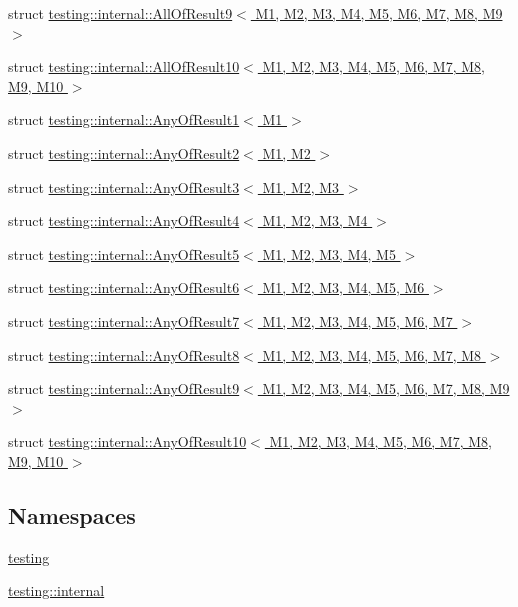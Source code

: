 \begin{DoxyCompactItemize}
\item 
struct \hyperlink{structtesting_1_1internal_1_1_all_of_result9}{testing\+::internal\+::\+All\+Of\+Result9$<$ M1, M2, M3, M4, M5, M6, M7, M8, M9 $>$}
\item 
struct \hyperlink{structtesting_1_1internal_1_1_all_of_result10}{testing\+::internal\+::\+All\+Of\+Result10$<$ M1, M2, M3, M4, M5, M6, M7, M8, M9, M10 $>$}
\item 
struct \hyperlink{structtesting_1_1internal_1_1_any_of_result1}{testing\+::internal\+::\+Any\+Of\+Result1$<$ M1 $>$}
\item 
struct \hyperlink{structtesting_1_1internal_1_1_any_of_result2}{testing\+::internal\+::\+Any\+Of\+Result2$<$ M1, M2 $>$}
\item 
struct \hyperlink{structtesting_1_1internal_1_1_any_of_result3}{testing\+::internal\+::\+Any\+Of\+Result3$<$ M1, M2, M3 $>$}
\item 
struct \hyperlink{structtesting_1_1internal_1_1_any_of_result4}{testing\+::internal\+::\+Any\+Of\+Result4$<$ M1, M2, M3, M4 $>$}
\item 
struct \hyperlink{structtesting_1_1internal_1_1_any_of_result5}{testing\+::internal\+::\+Any\+Of\+Result5$<$ M1, M2, M3, M4, M5 $>$}
\item 
struct \hyperlink{structtesting_1_1internal_1_1_any_of_result6}{testing\+::internal\+::\+Any\+Of\+Result6$<$ M1, M2, M3, M4, M5, M6 $>$}
\item 
struct \hyperlink{structtesting_1_1internal_1_1_any_of_result7}{testing\+::internal\+::\+Any\+Of\+Result7$<$ M1, M2, M3, M4, M5, M6, M7 $>$}
\item 
struct \hyperlink{structtesting_1_1internal_1_1_any_of_result8}{testing\+::internal\+::\+Any\+Of\+Result8$<$ M1, M2, M3, M4, M5, M6, M7, M8 $>$}
\item 
struct \hyperlink{structtesting_1_1internal_1_1_any_of_result9}{testing\+::internal\+::\+Any\+Of\+Result9$<$ M1, M2, M3, M4, M5, M6, M7, M8, M9 $>$}
\item 
struct \hyperlink{structtesting_1_1internal_1_1_any_of_result10}{testing\+::internal\+::\+Any\+Of\+Result10$<$ M1, M2, M3, M4, M5, M6, M7, M8, M9, M10 $>$}
\end{DoxyCompactItemize}
\subsection*{Namespaces}
\begin{DoxyCompactItemize}
\item 
 \hyperlink{namespacetesting}{testing}
\item 
 \hyperlink{namespacetesting_1_1internal}{testing\+::internal}
\end{DoxyCompactItemize}
